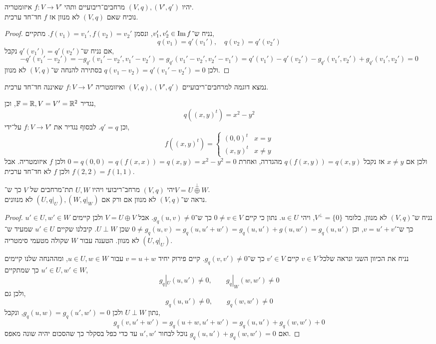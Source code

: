 \question{}
יהיו $(V, q), (V', q')$ מרחבים־ריבועיים ותהי $f : V \to V'$ איזומטריה. \\
נוכיח שאם $(V, q)$ לא מנוון אז $f$ חד־חד ערכית.
\begin{proof}
	נניח ש־$v_1', v_2' \in \operatorname{Im} f$, ונסמן $f(v_1) = v_1', f(v_2) = v_2'$.
	מתקיים,
	\[
		q(v_1) = q'(v_1'),
		\quad
		q(v_2) = q'(v_2')
	\]
	אם נניח ש־$q'(v_1') = q'(v_2')$ נקבל,
	\[
		-q'(v_1' - v_2')
		= -g_{q'}(v_1' - v_2', v_1' - v_2')
		= g_{q'}(v_1' - v_2', v_2' - v_1')
		= q'(v_1') - q'(v_2') - g_{q'}(v_1', v_2') + g_{q'}(v_1', v_2')
		= 0
	\]
	ולכן $q(v_1 - v_2) = q'(v_1' - v_2') = 0$ בסתירה להנחה ש־$(V, q)$ לא מנוון.
\end{proof}

\question{}
נמצא דוגמה למרחבים־ריבועיים $(V, q), (V', q')$ ואיזומטריה $f : V \to V'$ שאיננה חד־חד ערכית.
\begin{solution}
	נגדיר $\mathbb{F} = \mathbb{R}, V = V' = \mathbb{R}^2$, וכן,
	\[
		q({(x, y)}^t)
		= x^2 - y^2
	\]
	וכן $q' = q$.
	לבסוף נגדיר את $f : V \to V'$ על־ידי,
	\[
		f({(x, y)}^t)
		= \begin{cases}
			{(0, 0)}^t & x = y \\
			{(x, y)}^t & x \ne y
		\end{cases}
	\]
	ולכן אם $x \ne y$ אז נקבל $q(f(x, y)) = q(x, y)$ מהגדרה, ואחרת $0 = q(0, 0) = q(f(x, x)) = q(x, y) = x^2 - y^2 = 0$ ולכן $f$ איזומטריה.
	אבל $f(2, 2) = f(1, 1)$ ולכן $f$ לא חד־חד ערכית.
\end{solution}

\question{}
יהי $(V, q)$ מרחב־ריבועי ויהיו $U, W$ תת־מרחבים של $V$ כך ש־$V = U \overset{\perp}{\oplus} W$. \\
נראה ש־$(V, q)$ לא מנוון אם ורק אם $(U, q|_U), (W, q|_W)$ לא מנוונים.
\begin{proof}
	נניח ש־$(V, q)$ לא מנוון, כלומר $V^\perp = \{ 0 \}$, ויהי $u \in U$.
	נתון כי קיים $0 \ne v \in V$ כך ש־$g_q(u, v) \ne 0$.
	אבל $V = U \oplus V$ ולכן קיימים $u' \in U, w' \in W$ כך ש־$v = u' + v'$, וכן $0 \ne g_q(u, v) = g_q(u, u' + w') = g_q(u, u') + g(u, w') = g_q(u, u')$ שכן $U \perp W$.
	קיבלנו שקיים $u' \in U$ שמעיד ש־$(U, q|_U)$ לא מנוון. הטענה עבור $W$ שקולה מטעמי סימטריה.

	נניח את הכיוון השני ונראה שלכל $v \in V$ קיים $v' \in V$ כך ש־$g_q(v, v') \ne 0$.
	קיים פירוק יחיד $v = u + w$ עבור $u \in U, w \in W$, ומההנחה שלנו קיימים $u' \in U, w' \in W$ כך שמתקיים,
	\[
		g_q|_U(u, u')
		\ne 0,
		\qquad
		g_q|_W(w, w')
		\ne 0
	\]
	ולכן גם,
	\[
		g_q(u, u') \ne 0,
		\qquad
		g_q(w, w') \ne 0
	\]
	נתון $U \perp W$ ולכן $g_q(u, w) = g_q(u', w') = 0$, ונקבל,
	\[
		g_q(v, u' + w')
		= g_q(u + w, u' + w')
		= g_q(u, u') + g_q(w, w') + 0
	\]
	ואם $g_q(u, u') + g_q(w, w') = 0$ נוכל לבחור $u', w'$ עד כדי כפל בסקלר כך שהסכום יהיה שונה מאפס.
\end{proof}

